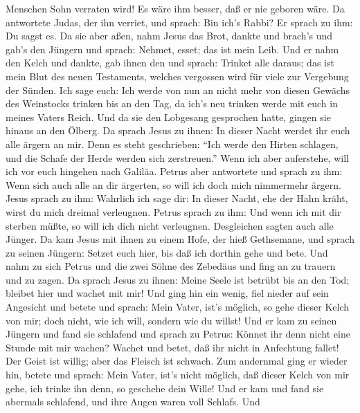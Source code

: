 Menschen Sohn verraten wird! Es wäre ihm besser, daß er nie geboren
wäre.  Da antwortete Judas, der ihn verriet, und sprach:
Bin ich's Rabbi? Er sprach zu ihm: Du sagst es.  Da sie
aber aßen, nahm Jesus das Brot, dankte und brach's und gab's den Jüngern
und sprach: Nehmet, esset; das ist mein Leib.  Und er nahm
den Kelch und dankte, gab ihnen den und sprach: Trinket alle daraus;
 das ist mein Blut des neuen Testaments, welches vergossen
wird für viele zur Vergebung der Sünden.  Ich sage euch:
Ich werde von nun an nicht mehr von diesen Gewächs des Weinstocks
trinken bis an den Tag, da ich's neu trinken werde mit euch in meines
Vaters Reich.  Und da sie den Lobgesang gesprochen hatte,
gingen sie hinaus an den Ölberg.  Da sprach Jesus zu ihnen:
In dieser Nacht werdet ihr euch alle ärgern an mir. Denn es steht
geschrieben: ``Ich werde den Hirten schlagen, und die Schafe der Herde
werden sich zerstreuen.''  Wenn ich aber auferstehe, will
ich vor euch hingehen nach Galiläa.  Petrus aber antwortete
und sprach zu ihm: Wenn sich auch alle an dir ärgerten, so will ich doch
mich nimmermehr ärgern.  Jesus sprach zu ihm: Wahrlich ich
sage dir: In dieser Nacht, ehe der Hahn kräht, wirst du mich dreimal
verleugnen.  Petrus sprach zu ihm: Und wenn ich mit dir
sterben müßte, so will ich dich nicht verleugnen. Desgleichen sagten
auch alle Jünger.  Da kam Jesus mit ihnen zu einem Hofe,
der hieß Gethsemane, und sprach zu seinen Jüngern: Setzet euch hier, bis
daß ich dorthin gehe und bete.  Und nahm zu sich Petrus und
die zwei Söhne des Zebedäus und fing an zu trauern und zu zagen.
 Da sprach Jesus zu ihnen: Meine Seele ist betrübt bis an
den Tod; bleibet hier und wachet mit mir!  Und ging hin ein
wenig, fiel nieder auf sein Angesicht und betete und sprach: Mein Vater,
ist's möglich, so gehe dieser Kelch von mir; doch nicht, wie ich will,
sondern wie du willst!  Und er kam zu seinen Jüngern und
fand sie schlafend und sprach zu Petrus: Könnet ihr denn nicht eine
Stunde mit mir wachen?  Wachet und betet, daß ihr nicht in
Anfechtung fallet! Der Geist ist willig; aber das Fleisch ist schwach.
 Zum andernmal ging er wieder hin, betete und sprach: Mein
Vater, ist's nicht möglich, daß dieser Kelch von mir gehe, ich trinke
ihn denn, so geschehe dein Wille!  Und er kam und fand sie
abermals schlafend, und ihre Augen waren voll Schlafs.  Und
